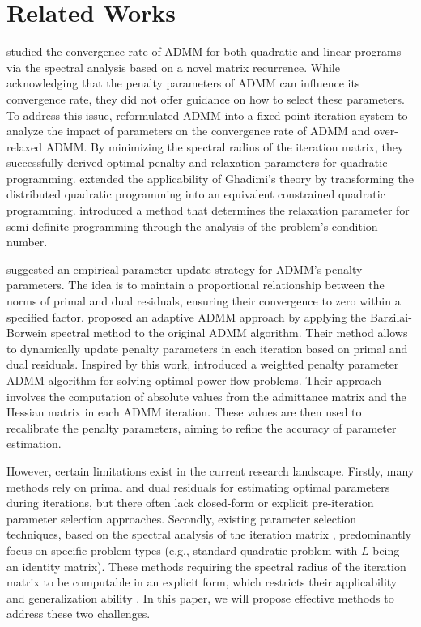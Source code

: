 \documentclass[letterpaper]{article} %
\begin{document}
\section{Related Works}
\cite{boley2013local} studied the convergence rate of ADMM for both quadratic and linear programs via the spectral analysis based on a novel matrix recurrence. While acknowledging that the penalty parameters of ADMM can influence its convergence rate, they did not offer guidance on how to select these parameters. To address this issue, \cite{ghadimi2014optimal} reformulated ADMM into a fixed-point iteration system to analyze the impact of parameters on the convergence rate of ADMM and over-relaxed ADMM. By minimizing the spectral radius of the iteration matrix, they successfully derived optimal penalty and relaxation parameters for quadratic programming. \cite{teixeira2015admm} extended the applicability of Ghadimi's theory by transforming the distributed quadratic programming into an equivalent constrained quadratic programming. \cite{francca2016explicit} introduced a method that determines the relaxation parameter for semi-definite programming through the analysis of the problem's condition number. 

\cite{boyd2011distributed} suggested an empirical parameter update strategy for ADMM's penalty parameters. The idea is to maintain a proportional relationship between the norms of primal and dual residuals, ensuring their convergence to zero within a specified factor. \cite{xu2017adaptive} proposed an adaptive ADMM approach by applying the Barzilai-Borwein spectral method to the original ADMM algorithm. Their method allows to dynamically update penalty parameters in each iteration based on primal and dual residuals. Inspired by this work, \cite{mavromatis2020auto} introduced a weighted penalty parameter ADMM algorithm for solving optimal power flow problems. Their approach involves the computation of absolute values from the admittance matrix and the Hessian matrix in each ADMM iteration. These values are then used to recalibrate the penalty parameters, aiming to refine the accuracy of parameter estimation.

However, certain limitations exist in the current research landscape. Firstly, many methods \cite{boyd2011distributed,xu2017adaptive,wohlberg2017admm,mhanna2018adaptive} rely on primal and dual residuals for estimating optimal parameters during iterations, but there often lack closed-form or explicit pre-iteration parameter selection approaches. Secondly, existing parameter selection techniques, based on the spectral analysis of the iteration matrix \cite{ghadimi2014optimal,francca2016explicit}, predominantly focus on specific problem types (e.g., standard quadratic problem with $L$ being an identity matrix). These methods requiring the spectral radius of the iteration matrix to be computable in an explicit form, which restricts their applicability and generalization ability \cite{stellato2020osqp}. In this paper, we will propose effective methods to address these two challenges.
\end{document}
